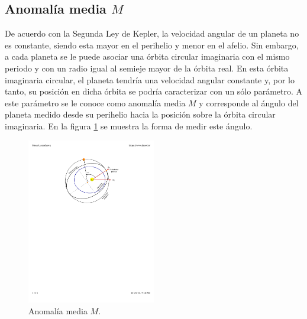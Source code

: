 \documentclass[a4paper,10pt]{article}
\begin{document}
\subsection{Anomalía media $M$}
De acuerdo con la Segunda Ley de Kepler, la velocidad angular de un planeta no es constante, siendo esta mayor en el perihelio y menor en el afelio. Sin embargo, a cada planeta se le puede asociar una órbita circular imaginaria con el mismo periodo y con un radio igual al semieje mayor de la órbita real. En esta órbita imaginaria circular, el planeta tendría una velocidad angular constante y, por lo tanto, su posición en dicha órbita se podría caracterizar con un sólo parámetro. A este parámetro se le conoce como anomalía media $M$ y corresponde al ángulo del planeta medido desde su perihelio hacia la posición sobre la órbita circular imaginaria. En la figura \ref{fig:MeanAnomaly} se muestra la forma de medir este ángulo.

\begin{figure}
  \centering
  \includegraphics[width=0.5\textwidth]{Figures/MeanAnomaly.pdf}
  \caption{Anomalía media $M$.}
  \label{fig:MeanAnomaly}
\end{figure}
\end{document}
